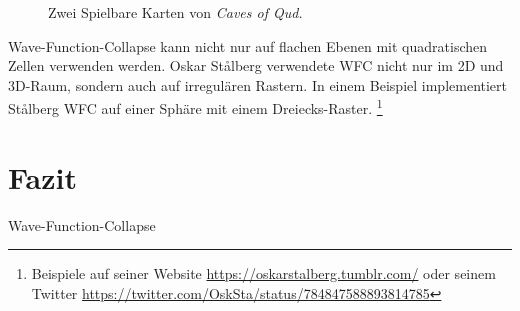 \documentclass[12pt, a4paper,twoside,openright]{report}
\begin{document}
\begin{figure}[H]
    \centering
    \caption{Zwei Spielbare Karten von \textit{Caves of Qud.} \cite{Karth2017WaveFunctionCollapseIC}}%
\end{figure}

Wave-Function-Collapse kann nicht nur auf flachen Ebenen mit quadratischen Zellen verwenden werden.
Oskar Stålberg verwendete WFC nicht nur im 2D und 3D-Raum, sondern auch auf irregulären Rastern.
In einem Beispiel implementiert Stålberg WFC auf einer Sphäre mit einem Dreiecks-Raster.
\footnote[7]{Beispiele auf seiner Website
\url{https://oskarstalberg.tumblr.com/}
oder seinem Twitter
\url{https://twitter.com/OskSta/status/784847588893814785}}

{\let\clearpage\relax\chapter{Fazit}}

Wave-Function-Collapse

\printbibliography
\end{document}
